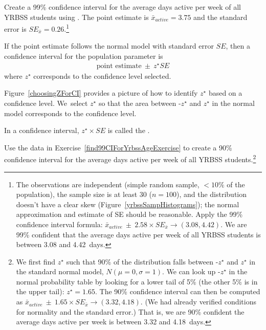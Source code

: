 
\begin{exercise} \label{find99CIForYrbssAgeExercise}
Create a 99\% confidence interval for the average days active per week of all YRBSS students using . The point estimate is $\bar{x}_{active} = 3.75$ and the standard error is $SE_{\bar{x}} = 0.26$.\footnote{The observations are independent (simple random sample, $<10\%$ of the population), the sample size is at least 30 ($n = 100$), and the distribution doesn't have a clear skew (Figure~\ref{yrbssSampHistograms}); the normal approximation and estimate of SE should be reasonable. Apply the 99\% confidence interval formula: $\bar{x}_{active}\ \pm\ 2.58 \times  SE_{\bar{x}} \rightarrow (3.08, 4.42)$. We are 99\% confident that the average days active per week of all YRBSS students is between 3.08 and 4.42~days.}
\end{exercise}

\begin{termBox}{
If the point estimate follows the normal model with standard error $SE$, then a confidence interval for the population parameter is
\begin{eqnarray*}
\text{point estimate}\ \pm\ z^{\star} SE
\end{eqnarray*}
where $z^{\star}$ corresponds to the confidence level selected.}
\end{termBox}

Figure~\ref{choosingZForCI} provides a picture of how to identify $z^{\star}$ based on a confidence level. We~select $z^{\star}$ so that the area between -$z^{\star}$ and $z^{\star}$ in the normal model corresponds to the confidence level. 

\begin{termBox}{
\label{marginOfErrorTermBox}In a confidence interval, $z^{\star}\times SE$ is called the .}
\end{termBox}

\begin{exercise} \label{find90CIForYrbssAgeExercise}
Use the data in Exercise~\ref{find99CIForYrbssAgeExercise} to create a 90\% confidence interval for the average days active per week of all YRBSS students.\footnote{We first find $z^{\star}$ such that 90\% of the distribution falls between -$z^{\star}$ and $z^{\star}$ in the standard normal model, $N(\mu=0, \sigma=1)$. We can look up -$z^{\star}$ in the normal probability table by looking for a lower tail of 5\% (the other 5\% is in the upper tail): $z^{\star}=1.65$. The 90\% confidence interval can then be computed as $\bar{x}_{active}\ \pm\ 1.65\times SE_{\bar{x}} \to (3.32, 4.18)$. (We had already verified conditions for normality and the standard error.) That is, we are 90\% confident the average days active per week is between 3.32 and 4.18~days.}
\end{exercise}

